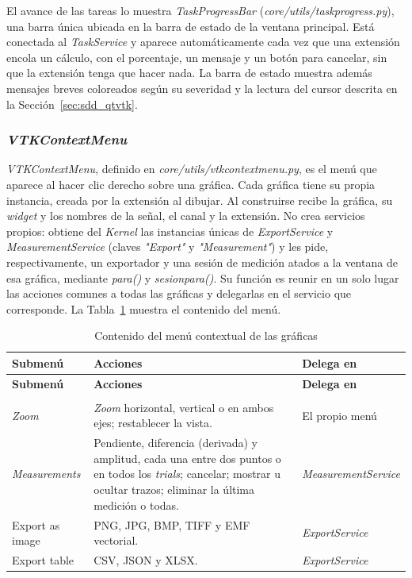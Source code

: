 \documentclass[12pt,letterpaper,oneside]{article}
\DeclareRobustCommand{\_}{\textunderscore\allowbreak}
\begin{document}
El avance de las tareas lo muestra \textit{TaskProgressBar} (\textit{core/utils/task\_progress.py}), una barra única ubicada en la barra de estado de la ventana principal. Está conectada al \textit{TaskService} y aparece automáticamente cada vez que una extensión encola un cálculo, con el porcentaje, un mensaje y un botón para cancelar, sin que la extensión tenga que hacer nada. La barra de estado muestra además mensajes breves coloreados según su severidad y la lectura del cursor descrita en la Sección~\ref{sec:sdd_qtvtk}.

\subsubsection{\textit{VTKContextMenu}}
\label{sec:sdd_contextmenu}

\textit{VTKContextMenu}, definido en \textit{core/utils/vtk\_context\_menu.py}, es el menú que aparece al hacer clic derecho sobre una gráfica. Cada gráfica tiene su propia instancia, creada por la extensión al dibujar. Al construirse recibe la gráfica, su \textit{widget} y los nombres de la señal, el canal y la extensión. No crea servicios propios: obtiene del \textit{Kernel} las instancias únicas de \textit{ExportService} y \textit{MeasurementService} (claves \textit{"Export"} y \textit{"Measurement"}) y les pide, respectivamente, un exportador y una sesión de medición atados a la ventana de esa gráfica, mediante \textit{para()} y \textit{sesion\_para()}. Su función es reunir en un solo lugar las acciones comunes a todas las gráficas y delegarlas en el servicio que corresponde. La Tabla~\ref{tab:sdd_contextmenu} muestra el contenido del menú.

\begin{center}
\small
\begin{longtable}{|p{}|p{}|p{}|}
\hline
\textbf{Submenú} & \textbf{Acciones} & \textbf{Delega en} \\
\hline
\endfirsthead
\hline
\textbf{Submenú} & \textbf{Acciones} & \textbf{Delega en} \\
\hline
\endhead
\hline
\endfoot
\hline
\caption{Contenido del menú contextual de las gráficas} \label{tab:sdd_contextmenu} \\
\endlastfoot
\textit{Zoom} & \textit{Zoom} horizontal, vertical o en ambos ejes; restablecer la vista. & El propio menú \\
\hline
\textit{Measurements} & Pendiente, diferencia (derivada) y amplitud, cada una entre dos puntos o en todos los \textit{trials}; cancelar; mostrar u ocultar trazos; eliminar la última medición o todas. & \textit{Measurement\-Service} \\
\hline
Export as image & PNG, JPG, BMP, TIFF y EMF vectorial. & \textit{ExportService} \\
\hline
Export table & CSV, JSON y XLSX. & \textit{ExportService} \\
\hline
\end{longtable}
\end{center}
\end{document}
